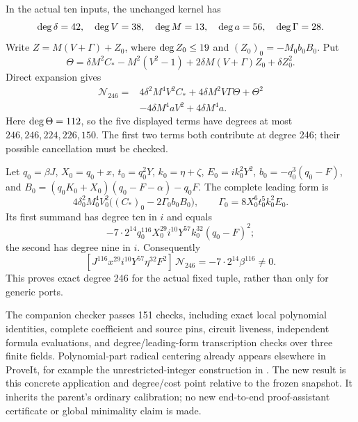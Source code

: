 In the actual ten inputs, the unchanged kernel has
\[
 \operatorname{deg}\delta=42,\quad\operatorname{deg} V=38,\quad\operatorname{deg} M=13,
 \quad\operatorname{deg} a=56,\quad\operatorname{deg}\Gamma=28.
\]
Write $Z=M(V+\Gamma)+Z_0$, where $\operatorname{deg} Z_0\le19$ and
$(Z_0)_0=-M_0b_0B_0$.  Put
\[
 \Theta=\delta M^2C_*-M^2(V^2-1)
       +2\delta M(V+\Gamma)Z_0+\delta Z_0^2.
\]
Direct expansion gives
\begin{equation}\label{eq:center-norm-expansion}
 \begin{aligned}
 \mathcal N_{246}={}&4\delta^2M^4V^2C_*
       +4\delta M^2V\Gamma\Theta+\Theta^2\\
       &-4\delta M^4aV^2+4\delta M^4a.
 \end{aligned}
\end{equation}
Here $\operatorname{deg}\Theta=112$, so the five displayed terms have degrees at most
$246,246,224,226,150$.  The first two terms both contribute at degree 246;
their possible cancellation must be checked.

Let $q_0=\beta J$, $X_0=q_0+x$, $t_0=q_0^2Y$, $k_0=\eta+\zeta$,
$E_0=ik_0^2Y^2$, $b_0=-q_0^3(q_0-F)$, and
$B_0=(q_0K_0+X_0)(q_0-F-\alpha)-q_0F$.
The complete leading form is
\[
 4\delta_0^2M_0^4V_0^2
 \bigl((C_*)_0-2\Gamma_0b_0B_0\bigr),
 \qquad\Gamma_0=8X_0^6t_0^5k_0^2E_0.
\]
Its first summand has degree ten in $i$ and equals
\[
 -7\cdot2^{14}q_0^{116}X_0^{29}i^{10}Y^{57}
                     k_0^{32}(q_0-F)^2;
\]
the second has degree nine in $i$.  Consequently
\begin{equation}\label{eq:center-coefficient}
 \boxed{[J^{116}x^{29}i^{10}Y^{57}\eta^{32}F^2]\,
          \mathcal N_{246}=-7\cdot2^{14}\beta^{116}\ne0.}
\end{equation}
This proves exact degree 246 for the actual fixed tuple, rather than
only for generic ports.

The companion checker passes 151 checks, including exact local polynomial
identities, complete coefficient and source pins, circuit liveness,
independent formula evaluations, and degree/leading-form transcription
checks over three finite fields.  Polynomial-part radical centering
already appears elsewhere in ProveIt, for example the unrestricted-integer
construction in .
The new result is this concrete application and degree/cost point relative
to the frozen snapshot.  It inherits the parent's ordinary calibration;
no new end-to-end proof-assistant certificate or global minimality claim
is made.
